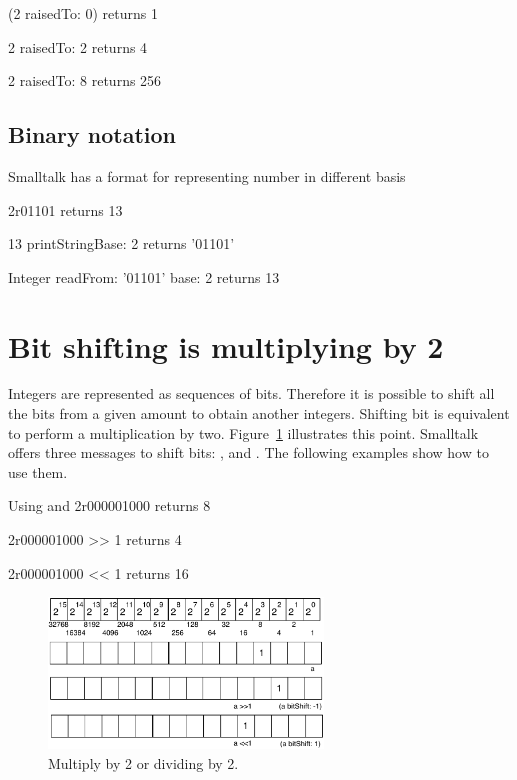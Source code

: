 \documentclass[a4paper,10pt,twoside]{book}
\begin{document}
\begin{code}{}
(2 raisedTo: 0)
	returns 1

2 raisedTo: 2
	returns 4
	
2 raisedTo: 8
	returns 256
\end{code}

\subsection*{Binary notation}
Smalltalk has a format for representing number in different basis

\begin{code}{}
2r01101
	returns 13

13 printStringBase: 2
	returns '01101'
	
Integer readFrom: '01101' base: 2 	
	returns 13
\end{code}



\section{Bit shifting is multiplying by 2}

Integers are represented as sequences of bits. Therefore it is possible to shift all the bits from a given amount to obtain another integers. Shifting bit is equivalent to perform a multiplication by two. Figure~\ref{bitshiftmult} illustrates this point. Smalltalk offers three messages to shift bits: ,  and . The following examples show how to use them.


\begin{code}{Using \ct{>>} and \ct{<<}}
2r000001000 
	returns 8

2r000001000 >> 1
	returns 4
	
2r000001000 << 1
	returns 16
\end{code}

\begin{figure}[h]
\begin{center}
\includegraphics[width=0.65\textwidth]{16bits-numberMultiplication}
\caption{Multiply by 2 or dividing by 2.\label{bitshiftmult}}
\end{center}
\end{figure}
\end{document}
